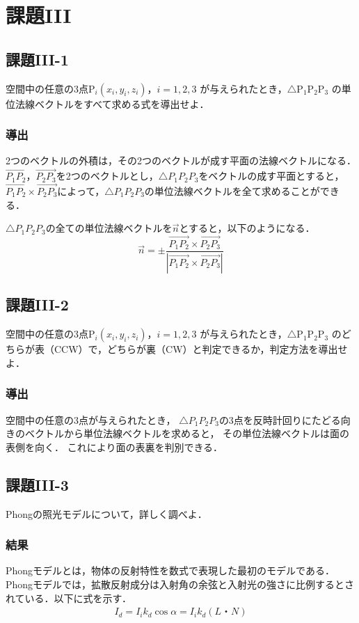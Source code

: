 \documentclass[]{jarticle}
\begin{document}
\section{課題III}
\subsection{課題III-1}
空間中の任意の$3$点$\mathrm{P}_{i}(x_{i},y_{i},z_{i})$，$i=1,2,3$
が与えられたとき，$\triangle\mathrm{P}_{1}\mathrm{P}_{2}\mathrm{P}_{3}$
の単位法線ベクトルをすべて求める式を導出せよ．
\subsubsection{導出}
2つのベクトルの外積は，その2つのベクトルが成す平面の法線ベクトルになる．
$\overrightarrow{P_1 P_2}$，$\overrightarrow{P_2 P_3}$を2つのベクトルとし，$\triangle{P_1P_2P_3}$をベクトルの成す平面とすると，$\overrightarrow{P_1 P_2}\times\overrightarrow{P_2 P_3}$によって，$\triangle{P_1P_2P_3}$の単位法線ベクトルを全て求めることができる．

$\triangle{P_1P_2P_3}$の全ての単位法線ベクトルを$\overrightarrow{n}$とすると，以下のようになる．
$$
  \overrightarrow{n} = \pm\frac{\overrightarrow{P_1 P_2}\times\overrightarrow{P_2 P_3}}{|\overrightarrow{P_1 P_2}\times\overrightarrow{P_2 P_3}|}
$$

\subsection{課題III-2}
空間中の任意の$3$点$\mathrm{P}_{i}(x_{i},y_{i},z_{i})$，$i=1,2,3$
が与えられたとき，$\triangle\mathrm{P}_{1}\mathrm{P}_{2}\mathrm{P}_{3}$
のどちらが表（CCW）で，どちらが裏（CW）と判定できるか，判定方法を導出せよ．

\subsubsection{導出}
空間中の任意の3点が与えられたとき，
$\triangle{P_1P_2P_3}$の3点を反時計回りにたどる向きのベクトルから単位法線ベクトルを求めると，
その単位法線ベクトルは面の表側を向く．
これにより面の表裏を判別できる．

\subsection{課題III-3}
Phongの照光モデルについて，詳しく調べよ．
\subsubsection{結果}
Phongモデルとは，物体の反射特性を数式で表現した最初のモデルである．Phongモデルでは，拡散反射成分は入射角の余弦と入射光の強さに比例するとされている．以下に式を示す．
\begin{eqnarray*}
  I_d = I_i k_d \cos\alpha = I_i k_d (L・N)
\end{eqnarray*}
\end{document}
